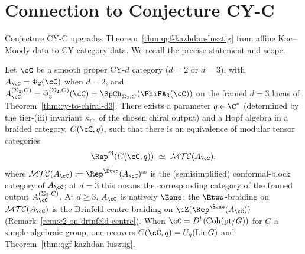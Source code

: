 \section{Connection to Conjecture CY-C}
\label{sec:qgf-cy-c-connection}

Conjecture CY-C upgrades Theorem~\ref{thm:qgf-kazhdan-lusztig} from affine Kac--Moody data to CY-category data. We recall the precise statement and scope.

\begin{conjecture}
\label{conj:qgf-cy-c}
Let $\cC$ be a smooth proper CY-$d$ category ($d = 2$ or $d = 3$), with
$A_\cC=\Phi_2(\cC)$ when $d=2$, and
$A_\cC^{(\Sigma_2,C)}=\Phi_3^{(\Sigma_2,C)}(\cC)
=\SpCh_{\Sigma_2,C}(\PhiFA_3(\cC))$ on the framed $d=3$ locus of
Theorem~\ref{thm:cy-to-chiral-d3}. There exists a parameter $q \in \C^*$
(determined by the tier-(iii) invariant $\kappa_{\mathrm{ch}}$ of the
chosen chiral output) and a Hopf algebra in a braided category,
$C(\cC, q)$, such that there is an equivalence of modular tensor
categories
\begin{equation}
 \Rep^{\mathrm{fd}}(C(\cC, q)) \ \simeq \ \mathcal{MTC}(A_\cC),
 \label{eq:qgf-cy-c}
\end{equation}
where $\mathcal{MTC}(A_\cC) := \Rep^{\Etwo}(A_\cC)^{\mathrm{ss}}$ is the
(semisimplified) conformal-block category of $A_\cC$; at $d=3$ this
means the corresponding category of the framed output
$A_\cC^{(\Sigma_2,C)}$. At $d \geq 3$, $A_\cC$ is natively $\Eone$; the $\Etwo$-braiding on
$\mathcal{MTC}(A_\cC)$ is the Drinfeld-centre braiding on
$\cZ(\Rep^{\Eone}(A_\cC))$
(Remark~\ref{rem:e2-on-drinfeld-centre}). When
$\cC = D^b(\mathrm{Coh}(\mathrm{pt}/G))$ for $G$ a simple algebraic
group, one recovers $C(\cC, q) = U_q(\mathrm{Lie}\, G)$ and
Theorem~\ref{thm:qgf-kazhdan-lusztig}.
\end{conjecture}

